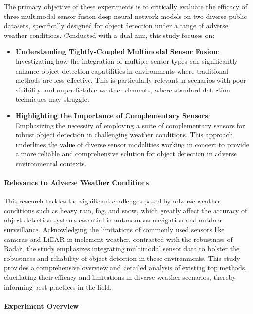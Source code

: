 \documentclass[report.tex]{subfiles}
\begin{document}
    The primary objective of these experiments is to critically evaluate the efficacy of three multimodal sensor fusion deep neural network models on two diverse public datasets, specifically designed for object detection under a range of adverse weather conditions. Conducted with a dual aim, this study focuses on:

    \begin{itemize}
        \item \textbf{Understanding Tightly-Coupled Multimodal Sensor Fusion}: Investigating how the integration of multiple sensor types can significantly enhance object detection capabilities in environments where traditional methods are less effective. This is particularly relevant in scenarios with poor visibility and unpredictable weather elements, where standard detection techniques may struggle.
        \item \textbf{Highlighting the Importance of Complementary Sensors}: Emphasizing the necessity of employing a suite of complementary sensors for robust object detection in challenging weather conditions. This approach underlines the value of diverse sensor modalities working in concert to provide a more reliable and comprehensive solution for object detection in adverse environmental contexts.
    \end{itemize}

    \paragraph*{Relevance to Adverse Weather Conditions}

    This research tackles the significant challenges posed by adverse weather conditions such as heavy rain, fog, and snow, which greatly affect the accuracy of object detection systems essential in autonomous navigation and outdoor surveillance. Acknowledging the limitations of commonly used sensors like cameras and LiDAR in inclement weather, contrasted with the robustness of Radar, the study emphasizes integrating multimodal sensor data to bolster the robustness and reliability of object detection in these environments. This study provides a comprehensive overview and detailed analysis of existing top methods, elucidating their efficacy and limitations in diverse weather scenarios, thereby informing best practices in the field.

    \paragraph*{Experiment Overview}
\end{document}
